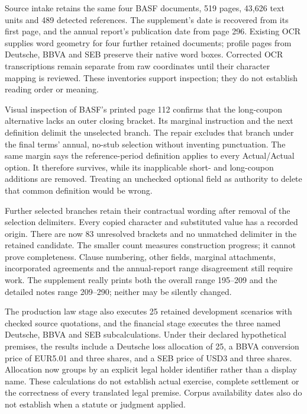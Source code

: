 Source intake retains the same four BASF documents, 519 pages, 43,626 text units
and 489 detected references. The supplement's date is recovered from its first
page, and the annual report's publication date from page 296. Existing OCR
supplies word geometry for four further retained documents; profile pages from
Deutsche, BBVA and SEB preserve their native word boxes. Corrected OCR
transcriptions remain separate from raw coordinates until their character
mapping is reviewed. These inventories support inspection; they do not establish
reading order or meaning.

Visual inspection of BASF's printed page 112 confirms that the long-coupon
alternative lacks an outer closing bracket. Its marginal instruction and the
next definition delimit the unselected branch. The repair excludes that branch
under the final terms' annual, no-stub selection without inventing punctuation.
The same margin says the reference-period definition applies to every
Actual/Actual option. It therefore survives, while its inapplicable short- and
long-coupon additions are removed. Treating an unchecked optional field as
authority to delete that common definition would be wrong.

Further selected branches retain their contractual wording after removal of
the selection delimiters. Every copied character and substituted value has a
recorded origin. There are now 83 unresolved brackets and no unmatched delimiter
in the retained candidate. The smaller count measures construction progress;
it cannot prove completeness. Clause numbering, other fields, marginal
attachments, incorporated agreements and the annual-report range disagreement
still require work. The supplement really prints both the overall range
195--209 and the detailed notes range 209--290; neither may be silently changed.

The production law stage also executes 25 retained development scenarios with
checked source quotations, and the financial stage executes the three named
Deutsche, BBVA and SEB subcalculations. Under their declared hypothetical
premises, the results include a Deutsche loss allocation of 25, a BBVA conversion
price of EUR5.01 and three shares, and a SEB price of USD3 and three shares.
Allocation now groups by an explicit legal holder identifier rather than a
display name. These calculations do not establish actual exercise, complete
settlement or the correctness of every translated legal premise. Corpus
availability dates also do not establish when a statute or judgment applied.


